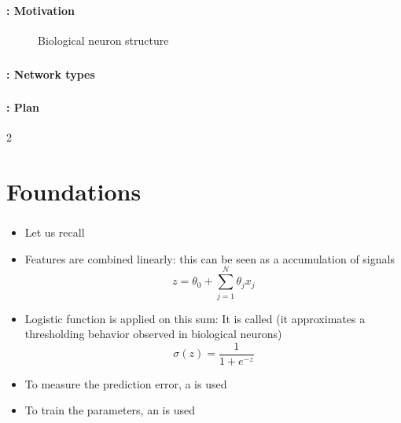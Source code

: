 \documentclass[xcolor=table]{beamer}
\subtitle[Neural networks]{Neural networks}
\begin{document}
\begin{frame}
	\frametitle{\inserttitle}
	\framesubtitle{\insertshortsubtitle: Motivation}
	
	\begin{figure}
		\centering
		\caption{Biological neuron structure \cite{2017-cain}}
	\end{figure}

\end{frame}

\begin{frame}
	\frametitle{\inserttitle}
	\framesubtitle{\insertshortsubtitle: Network types}
	
	
\end{frame}

\begin{frame}
	\frametitle{\inserttitle}
	\framesubtitle{\insertshortsubtitle: Plan}

	\begin{multicols}{2}
		\tableofcontents
	\end{multicols}
\end{frame}

\section{Foundations}

\begin{frame}
	\frametitle{\insertshortsubtitle}
	\framesubtitle{\insertsection}
	
	\begin{itemize}
		\item Let us recall 
		\item Features are combined linearly: this can be seen as a accumulation of signals
		\[z = \theta_0 + \sum\limits_{j=1}^{N} \theta_j x_j\]
		\item Logistic function is applied on this sum: It is called  (it approximates a thresholding behavior observed in biological neurons)
		\[\sigma(z) = \frac{1}{1 + e^{-z}}\] 
		\item To measure the prediction error, a  is used
		\item To train the parameters, an  is used
	\end{itemize}

\end{frame}
\end{document}
